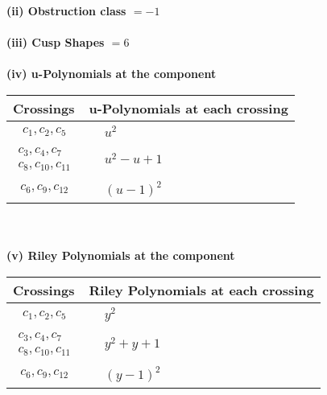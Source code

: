 \documentclass[1p]{elsarticle_modified}
\theoremstyle{definition}
\begin{document}
\flushleft \textbf{(ii) Obstruction class $= -1$}\\~\\
\flushleft \textbf{(iii) Cusp Shapes $= 6$}\\~\\
\newpage\renewcommand{\arraystretch}{1}
\flushleft \textbf{(iv) u-Polynomials at the component}\newline \\
\begin{tabular}{m{50pt}|m{274pt}}
Crossings & \hspace{64pt}u-Polynomials at each crossing \\
\hline $$\begin{aligned}c_{1},c_{2},c_{5}\end{aligned}$$&$\begin{aligned}
&u^2
\end{aligned}$\\
\hline $$\begin{aligned}c_{3},c_{4},c_{7}\\c_{8},c_{10},c_{11}\end{aligned}$$&$\begin{aligned}
&u^2- u+1
\end{aligned}$\\
\hline $$\begin{aligned}c_{6},c_{9},c_{12}\end{aligned}$$&$\begin{aligned}
&(u-1)^2
\end{aligned}$\\
\hline
\end{tabular}\\~\\
\newpage\renewcommand{\arraystretch}{1}
\flushleft \textbf{(v) Riley Polynomials at the component}\newline \\
\begin{tabular}{m{50pt}|m{274pt}}
Crossings & \hspace{64pt}Riley Polynomials at each crossing \\
\hline $$\begin{aligned}c_{1},c_{2},c_{5}\end{aligned}$$&$\begin{aligned}
&y^2
\end{aligned}$\\
\hline $$\begin{aligned}c_{3},c_{4},c_{7}\\c_{8},c_{10},c_{11}\end{aligned}$$&$\begin{aligned}
&y^2+y+1
\end{aligned}$\\
\hline $$\begin{aligned}c_{6},c_{9},c_{12}\end{aligned}$$&$\begin{aligned}
&(y-1)^2
\end{aligned}$\\
\hline
\end{tabular}\\~\\
\end{document}
